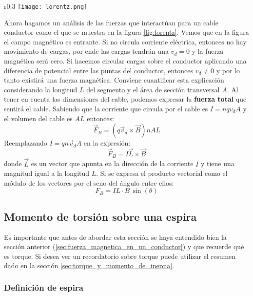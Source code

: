 \begin{wrapfigure}{r}{0.3\textwidth}
  \centering
  \texttt{[image: lorentz.png]}
  \caption{Un segmento de un alambre conduciendo corriente en un campo magnético \(\vec{B}\)}
  \label{fig:lorentz}
\end{wrapfigure}
Ahora hagamos un análisis de las fuerzas que interactúan para un cable conductor como el que se muestra en la figura \ref{fig:lorentz}. Vemos que en la figura el campo magnético es entrante. Si no circula corriente eléctrica, entonces no hay movimiento de cargas, por ende las cargas tendrán una \(v_d=0\) y la fuerza magnética será cero. Si hacemos circular cargas sobre el conductor aplicando una diferencia de potencial entre las puntas del conductor, entonces \(v_d \neq 0\) y por lo tanto existirá una fuerza magnética. 
Conviene cuantificar esta explicación considerando la longitud \(L\) del segmento y el área de sección transversal \(A\). Al tener en cuenta las dimensiones del cable, podemos expresar la \textbf{fuerza total} que sentirá el cable. Sabiendo que la corriente que circula por el cable es \(I = nq v_d A\) y el volumen del cable es \(AL\) entonces: 
\[
  \vec{F}_B = (q\vec{v}_d \times \vec{B})nAL
\]
Reemplazando \(I=qn \vec{v}_d A\) en la expresión:
\[
  \vec{F}_B = I\vec{L} \times \vec{B}
\]
donde \(\vec{L}\) es un vector que apunta en la dirección de la corriente \(I\) y tiene una magnitud igual a la longitud \(L\). Si se expresa el producto vectorial como el módulo de los vectores por el seno del ángulo entre ellos:
\begin{equation}
  \boxed{F_B = IL \cdot B \, \sin(\theta)}
  \label{eq:fuerza_magnetica_en_un_conductor}
\end{equation}

\subsection{Momento de torsión sobre una espira}

Es importante que antes de abordar esta sección se haya entendido bien la sección anterior (\ref{sec:fuerza_magnetica_en_un_conductor}) y que recuerde qué es torque. Si desea ver un recordatorio sobre torque puede utilizar el resumen dado en la sección \ref{sec:torque_y_momento_de_inercia}.

\subsubsection{Definición de espira}

